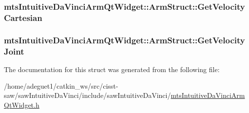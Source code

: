 \hypertarget{structmts_intuitive_da_vinci_arm_qt_widget_1_1_arm_struct_ae2d860fd82111f8496a9c9047154e082}{
\subsubsection[{Get\-Velocity\-Cartesian}]{ mts\-Intuitive\-Da\-Vinci\-Arm\-Qt\-Widget\-::\-Arm\-Struct\-::\-Get\-Velocity\-Cartesian}}\label{structmts_intuitive_da_vinci_arm_qt_widget_1_1_arm_struct_ae2d860fd82111f8496a9c9047154e082}
\hypertarget{structmts_intuitive_da_vinci_arm_qt_widget_1_1_arm_struct_ab26d7fde80beb11e4c052e80d6b8c60b}{
\subsubsection[{Get\-Velocity\-Joint}]{ mts\-Intuitive\-Da\-Vinci\-Arm\-Qt\-Widget\-::\-Arm\-Struct\-::\-Get\-Velocity\-Joint}}\label{structmts_intuitive_da_vinci_arm_qt_widget_1_1_arm_struct_ab26d7fde80beb11e4c052e80d6b8c60b}


The documentation for this struct was generated from the following file\-:\begin{DoxyCompactItemize}
\item 
/home/adeguet1/catkin\-\_\-ws/src/cisst-\/saw/saw\-Intuitive\-Da\-Vinci/include/saw\-Intuitive\-Da\-Vinci/\hyperlink{mts_intuitive_da_vinci_arm_qt_widget_8h}{mts\-Intuitive\-Da\-Vinci\-Arm\-Qt\-Widget.\-h}\end{DoxyCompactItemize}
